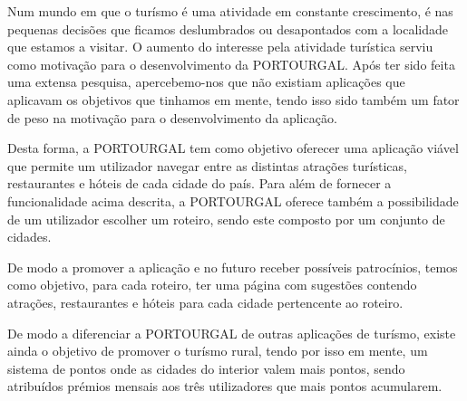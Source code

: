 Num mundo em que o turísmo é uma atividade em constante crescimento, é nas pequenas decisões que ficamos deslumbrados ou desapontados com a localidade que estamos a visitar. O aumento do interesse pela atividade turística serviu como motivação para o desenvolvimento da PORTOURGAL. Após ter sido feita uma extensa pesquisa, apercebemo-nos que não existiam aplicações que aplicavam os objetivos que tinhamos em mente, tendo isso sido também um fator de peso na motivação para o desenvolvimento da aplicação.
\par Desta forma, a PORTOURGAL tem como objetivo oferecer uma aplicação viável que permite um utilizador navegar entre as distintas atrações turísticas, restaurantes e hóteis de cada cidade do país. Para além de fornecer a funcionalidade acima descrita, a PORTOURGAL oferece também a possibilidade de um utilizador escolher um roteiro, sendo este composto por um conjunto de cidades.
\par De modo a promover a aplicação e no futuro receber possíveis patrocínios, temos como objetivo, para cada roteiro, ter uma página com sugestões contendo atrações, restaurantes e hóteis para cada cidade pertencente ao roteiro.
\par De modo a diferenciar a PORTOURGAL de outras aplicações de turísmo, existe ainda o objetivo de promover o turísmo rural, tendo por isso em mente, um sistema de pontos onde as cidades do interior valem mais pontos, sendo atribuídos prémios mensais aos três utilizadores que mais pontos acumularem.